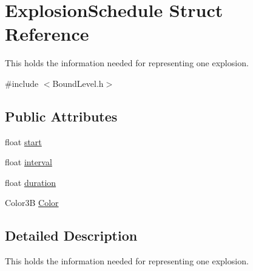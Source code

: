 \hypertarget{struct_explosion_schedule}{\section{\-Explosion\-Schedule \-Struct \-Reference}
\label{struct_explosion_schedule}
}


\-This holds the information needed for representing one explosion.  




{\ttfamily \#include $<$\-Bound\-Level.\-h$>$}

\subsection*{\-Public \-Attributes}
\begin{DoxyCompactItemize}
\item 
float \hyperlink{struct_explosion_schedule_a40229a03d0070fa6d8028cac8b7490e0}{start}
\item 
float \hyperlink{struct_explosion_schedule_a522eba73a372d30f86e5dfa608329ed6}{interval}
\item 
float \hyperlink{struct_explosion_schedule_a53661dc35b3c59c679ebe5ef1cebc29d}{duration}
\item 
\-Color3\-B \hyperlink{struct_explosion_schedule_ab3b56c84ed3937a294738e7c4b97b1da}{\-Color}
\end{DoxyCompactItemize}


\subsection{\-Detailed \-Description}
\-This holds the information needed for representing one explosion. 


